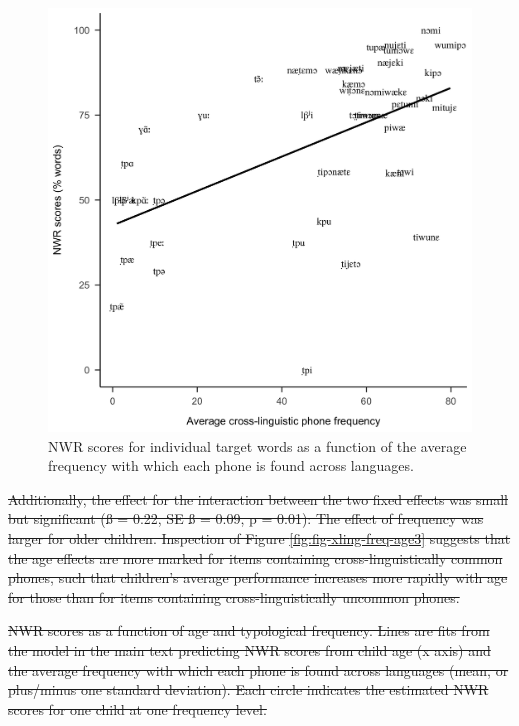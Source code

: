 \documentclass[english,,man,floatsintext]{apa6} %
\providecommand{\DIFdeltex}[1]{{\protect\color{red}\sout{#1}}}                      %
\providecommand{\DIFdelbegin}{} %
\providecommand{\DIFdelFL}[1]{\DIFdel{#1}} %
\providecommand{\DIFdel}[1]{\texorpdfstring{\DIFdeltex{#1}}{}} %
\newcommand{\DIFscaledelfig}{0.5}
\newlength{\DIFdelgraphicswidth} %
\newlength{\DIFdelgraphicsheight} %
\newcommand{\DIFdelincludegraphics}[2][]{%
	\sbox{\DIFdelgraphicsbox}{\DIFOincludegraphics[#1]{#2}}%
	\settoboxwidth{\DIFdelgraphicswidth}{\DIFdelgraphicsbox} %
	\settoboxtotalheight{\DIFdelgraphicsheight}{\DIFdelgraphicsbox} %
	\scalebox{\DIFscaledelfig}{%
		\parbox[b]{\DIFdelgraphicswidth}{\usebox{\DIFdelgraphicsbox}\\[-\baselineskip] \rule{\DIFdelgraphicswidth}{0em}}\llap{\resizebox{\DIFdelgraphicswidth}{\DIFdelgraphicsheight}{%
				\setlength{\unitlength}{\DIFdelgraphicswidth}%
				\begin{picture}(1,1)%
				\thicklines\linethickness{2pt} %
				{\color[rgb]{1,0,0}\put(0,0){\framebox(1,1){}}}%
				{\color[rgb]{1,0,0}\put(0,0){\line( 1,1){1}}}%
				{\color[rgb]{1,0,0}\put(0,1){\line(1,-1){1}}}%
				\end{picture}%
			}\hspace*{3pt}}} %
} %
\DeclareRobustCommand{\DIFdelbegin}{\DIFOdelbegin \let\includegraphics\DIFdelincludegraphics} %
\begin{document}
\begin{figure}[!t]
	
	{\centering \includegraphics[width=0.65\linewidth]{nwr.by.freq.ITEM} 
		
	}
	
	\caption{NWR scores for individual target words as a function of the average frequency with which each phone is found across languages.}\label{fig:fig-xling-freq}
\end{figure}

\DIFdelbegin \DIFdel{Additionally, the effect for the interaction between the two fixed effects was small but significant (ß = 0.22, SE ß = 0.09, p = 0.01): The effect of frequency was larger for older children. Inspection of Figure \ref{fig:fig-xling-freq-age3} suggests that the age effects are more marked for items containing cross-linguistically common phones, such that children's average performance increases more rapidly with age for those than for items containing cross-linguistically uncommon phones.
}%




{%
	\DIFdelFL{NWR scores as a function of age and typological frequency. Lines are fits from the model in the main text predicting NWR scores from child age (x axis) and the average frequency with which each phone is found across languages (mean, or plus/minus one standard deviation). Each circle indicates the estimated NWR scores for one child at one frequency level.}}%
\end{document}
